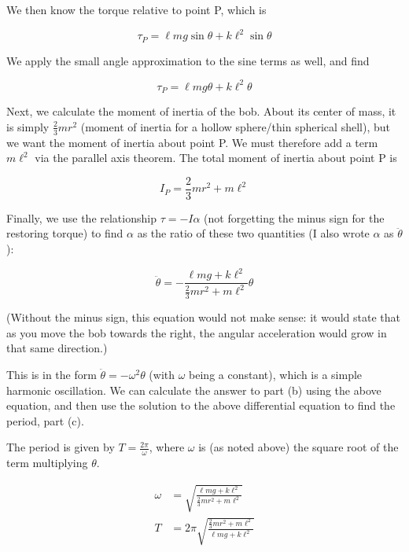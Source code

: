 \documentclass[8.01x]{subfiles}
\begin{document}
We then know the torque relative to point P, which is

\begin{equation}
\tau_P = \ell m g \sin \theta + k \ell^2 \sin \theta
\end{equation}

We apply the small angle approximation to the sine terms as well, and find

\begin{equation}
\tau_P = \ell m g \theta + k \ell^2 \theta
\end{equation}

Next, we calculate the moment of inertia of the bob. About its center of mass, it is simply $\frac{2}{3} m r^2$ (moment of inertia for a hollow sphere/thin spherical shell), but we want the moment of inertia about point P. We must therefore add a term $m \ell^2$ via the parallel axis theorem. The total moment of inertia about point P is

\begin{equation}
I_P = \frac{2}{3} m r^2 + m \ell^2
\end{equation}

Finally, we use the relationship $\tau = -I \alpha$ (not forgetting the minus sign for the restoring torque) to find $\alpha$ as the ratio of these two quantities (I also wrote $\alpha$ as $\ddot{\theta}$):

\begin{equation}
\ddot{\theta} = - \frac{\ell m g + k \ell^2}{\frac{2}{3} m r^2 + m \ell^2} \theta
\end{equation}

(Without the minus sign, this equation would not make sense: it would state that as you move the bob towards the right, the angular acceleration would grow in that same direction.)

This is in the form $\ddot{\theta} = -\omega^2 \theta$ (with $\omega$ being a constant), which is a simple harmonic oscillation. We can calculate the answer to part (b) using the above equation, and then use the solution to the above differential equation to find the period, part (c).

The period is given by $\displaystyle T = \frac{2\pi}{\omega}$, where $\omega$ is (as noted above) the square root of the term multiplying $\theta$.

\begin{align}
\omega &= \sqrt{\frac{\ell m g + k \ell^2}{\frac{2}{3} m r^2 + m \ell^2}}\\
T &= 2 \pi \sqrt{\frac{\frac{2}{3} m r^2 + m \ell^2}{\ell m g + k \ell^2}}
\end{align}
\end{document}

